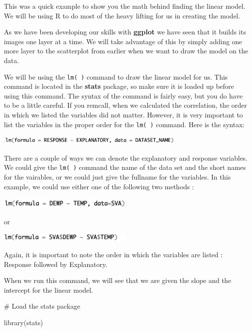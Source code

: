 \documentclass[
  letterpaper,
  DIV=11,
  numbers=noendperiod]{scrreprt}
\newenvironment{Shaded}{\begin{snugshade}}{\end{snugshade}}
\newcommand{\CommentTok}[1]{\textcolor[rgb]{0.37,0.37,0.37}{#1}}
\newcommand{\FunctionTok}[1]{\textcolor[rgb]{0.28,0.35,0.67}{#1}}
\newcommand{\NormalTok}[1]{\textcolor[rgb]{0.00,0.23,0.31}{#1}}
\begin{document}
This was a quick example to show you the math behind finding the linear
model. We will be using R to do most of the heavy lifting for us in
creating the model.

As we have been developing our skills with \textbf{ggplot} we have seen
that it builds its images one layer at a time. We will take advantage of
this by simply adding one more layer to the scatterplot from earlier
when we want to draw the model on the data.

We will be using the \texttt{lm(\ )} command to draw the linear model
for us. This command is located in the \textbf{stats} package, so make
sure it is loaded up before using this command. The syntax of the
command is fairly easy, but you do have to be a little careful. If you
remcall, when we calculated the correlation, the order in which we
listed the variables did not matter. However, it is very important to
list the variables in the proper order for the \texttt{lm(\ )} command.
Here is the syntax:

\includegraphics[width=0.7\textwidth,height=\textheight]{./images/LMR_8.jpg}

There are a couple of ways we can denote the explanatory and response
variables. We could give the \texttt{lm(\ )} command the name of the
data set and the short names for the vairables, or we could just give
the fullname for the variables. In this example, we could use either one
of the following two methods :

\includegraphics[width=0.5\textwidth,height=\textheight]{./images/LMR_9.jpg}

or

\includegraphics[width=0.5\textwidth,height=\textheight]{./images/LMR_10.jpg}

Again, it is important to note the order in which the variables are
listed : Response followed by Explanatory.

When we run this command, we will see that we are given the slope and
the intercept for the linear model.

\begin{Shaded}
\begin{Highlighting}[]
\CommentTok{\# Load the stats package}

\FunctionTok{library}\NormalTok{(stats)}
\end{Highlighting}
\end{Shaded}
\end{document}
